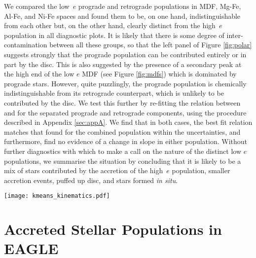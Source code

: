 We compared the low~$e$ prograde and retrograde populations in MDF,
Mg-Fe, Al-Fe, and Ni-Fe spaces and found them to be, on one hand,
indistinguishable from each other but, on the other hand, clearly
distinct from the high~$e$ population in all diagnostic plots.  It
is likely that there is some degree of inter-contamination between
all these groups, so that the left panel of Figure \ref{fig:polar}
suggests strongly that the prograde population can be contributed
entirely or in part by the disc.  This is also suggested by the
presence of a secondary peak at the high \feh{} end of the low $e$
MDF (see Figure \ref{fig:mdfs}) which is dominated by prograde
stars.  However, quite puzzlingly, the prograde population is
chemically indistinguishable from its retrograde counterpart, which
is unlikely to be contributed by the disc.  We test this further
by re-fitting the relation between \mgfe{} and \feh{} for the
separated prograde and retrograde components, using the procedure
described in Appendix \ref{sec:appA}. We find that in both cases,
the best fit relation matches that found for the combined population
within the uncertainties, and furthermore, find no evidence of a
change in slope in either population.  Without further diagnostics
with which to make a call on the nature of the distinct low $e$
populations, we summarise the situation by concluding that it is
likely to be a mix of stars contributed by the accretion of the
high~$e$ population, smaller accretion events, puffed up disc, and
stars formed {\it in situ}.

\begin{figure*} \texttt{[image: kmeans\_kinematics.pdf]}
\caption{\label{fig:polar} Distribution of disc and accreted halo
populations in spherical polar coordinate planes.  On the left
panel, the high $e$ population occupies the same locus in $v_R-v_\phi$
space (left panel) as the population identified by
\citet{2018MNRAS.478..611B}.  The low $e$ population splits into
two populations according to $v_\phi$, with one prograde and one
retrograde component, suggesting that this population may in fact
be from a mix of disc contaminants and debris from smaller satellites.
} \end{figure*}


\section{Accreted Stellar Populations in EAGLE} \label{eagle}

